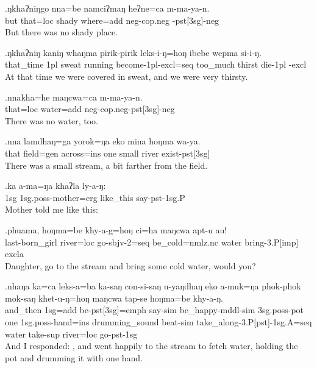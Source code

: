 \exg.ŋkhaʔniŋgo nna=be     namciʔmaŋ heʔne=ca        m-ma-ya-n.\\
 but           that{\sc =loc} shady       where{\sc =add} {\sc neg-cop.neg -pst[3sg]-neg}\\
But there was no shady place.

\exg.ŋkhaʔniŋ kaniŋ whaŋma pirik-pirik    leks-i-ŋ=hoŋ               ibebe    wepma  si-i-ŋ.\\
 that\_time   {\sc 1pl}   sweat   running become{\sc -1pl-excl=seq}  too\_much thirst die{\sc -1pl -excl}\\
At that time we were covered in sweat, and we were very thirsty.

\exg.nnakha=he    maŋcwa=ca        m-ma-ya-n.\\
 that{\sc =loc} water{\sc =add} {\sc neg-cop.neg-pst[3sg]-neg}\\
There was no water, too.

\exg.nna  lamdhaŋ=ga    yorok=ŋa        eko mina  hoŋma wa-ya.\\
 that field{\sc =gen} across{\sc =ins} one small river  exist{\sc -pst[3sg]}\\
There was a small stream, a bit farther from the field.

\exg.ka  a-ma=ŋa                khaʔla   ly-a-ŋ:\\
 {\sc 1sg} {\sc 1sg.poss-}mother{\sc =erg} like\_this say{\sc -pst-1sg.P}\\
Mother told me like this:

\exg.phuama,         hoŋma=be    khy-a-g=hoŋ             ci=ha                  maŋcwa apt-u           au!\\
 last-born\_girl river{\sc =loc} go{\sc -sbjv-2=seq}  be\_cold{\sc =nmlz.nc} water   bring{\sc -3.P[imp]} {\sc excla}\\
Daughter, go to the stream and bring some cold water, would you?

\exg.nhaŋa   ka=ca         leks-a=ba                ka-saŋ       con-si-saŋ                    u-yaŋdhaŋ eko a-muk=ŋa             phok-phok      mok-saŋ       khet-u-ŋ=hoŋ                      maŋcwa tap-se         hoŋma=be    khy-a-ŋ.\\
 and\_then {\sc 1sg=add} be{\sc -pst[3sg]=emph} say{\sc -sim} be\_happy{\sc -mddl-sim} {\sc 3sg.poss-}pot
 one {\sc 1sg.poss-}hand{\sc =ins} drumming\_sound beat{\sc -sim} take\_along{\sc -3.P[pst]-1sg.A=seq}  water   take{\sc -sup} river{\sc =loc} go{\sc -pst-1sg}\\
And I responded: , and went happily to the stream to fetch water, holding the pot and drumming it with one hand.

